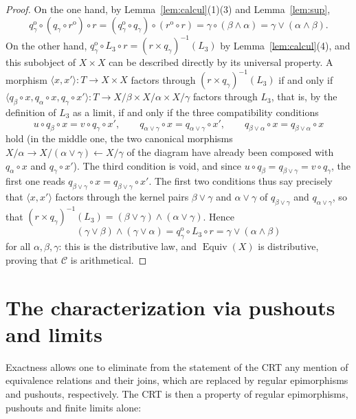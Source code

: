 \documentclass[11pt,a4paper]{article}
\theoremstyle{plain}
\theoremstyle{definition}
\theoremstyle{remark}
\theoremstyle{plain}
\newcommand{\C}{\mathcal{C}}
\newcommand{\Equiv}{\operatorname{Equiv}}
\newcommand{\op}{\mathrm{o}}
\begin{document}
\begin{proof}
On the one hand, by Lemma~\ref{lem:calcul}(1)(3) and
Lemma~\ref{lem:sup},
\[
q_\gamma^{\op} \circ (q_\gamma \circ r^{\op}) \circ r
= (q_\gamma^{\op} \circ q_\gamma) \circ (r^{\op} \circ r)
= \gamma \circ (\beta \wedge \alpha)
= \gamma \vee (\alpha \wedge \beta).
\]
On the other hand, $q_\gamma^{\op} \circ L_3 \circ r
= (r \times q_\gamma)^{-1}(L_3)$ by Lemma~\ref{lem:calcul}(4), and this
subobject of $X \times X$ can be described directly by its universal
property. A morphism $\langle x, x'\rangle \colon T \to X \times X$
factors through $(r \times q_\gamma)^{-1}(L_3)$ if and only if
$\langle q_\beta \circ x, q_\alpha \circ x, q_\gamma \circ x'\rangle \colon T \to X/\beta
\times X/\alpha \times X/\gamma$ factors through $L_3$, that is, by the
definition of $L_3$ as a limit, if and only if the three compatibility
conditions
\[
u \circ q_\beta \circ x = v \circ q_\gamma \circ x', \qquad
q_{\alpha \vee \gamma} \circ x = q_{\alpha \vee \gamma} \circ x', \qquad
q_{\beta \vee \alpha} \circ x = q_{\beta \vee \alpha} \circ x
\]
hold (in the middle one, the two canonical morphisms
$X/\alpha \to X/(\alpha\vee\gamma) \leftarrow X/\gamma$ of the diagram have
already been composed with $q_\alpha \circ x$ and $q_\gamma \circ x'$). The third
condition is void, and since $u \circ q_\beta = q_{\beta\vee\gamma}
= v \circ q_\gamma$, the first one reads
$q_{\beta\vee\gamma} \circ x = q_{\beta\vee\gamma} \circ x'$.
The first two conditions thus say precisely that $\langle x, x'\rangle$
factors through the kernel pairs $\beta \vee \gamma$ and
$\alpha \vee \gamma$ of $q_{\beta\vee\gamma}$ and $q_{\alpha\vee\gamma}$,
so that $(r \times q_\gamma)^{-1}(L_3) = (\beta\vee\gamma) \wedge
(\alpha\vee\gamma)$. Hence
\[
(\gamma \vee \beta) \wedge (\gamma \vee \alpha)
= q_\gamma^{\op} \circ L_3 \circ r
= \gamma \vee (\alpha \wedge \beta)
\]
for all $\alpha, \beta, \gamma$: this is the distributive law, and
$\Equiv(X)$ is distributive, proving that $\C$ is
arithmetical.
\end{proof}

\section{The characterization via pushouts and limits}\label{sec:diag}

Exactness allows one to eliminate from the statement of the CRT any mention
of equivalence relations and their joins, which are replaced by regular epimorphisms and
pushouts, respectively. The CRT is then a property of regular
epimorphisms, pushouts and finite limits alone:
\end{document}
